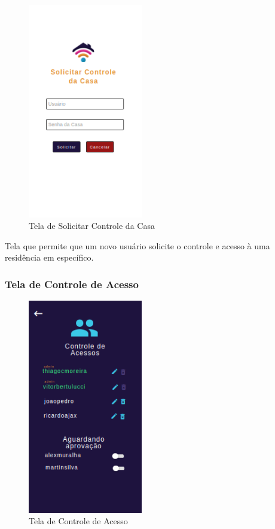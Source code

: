 \begin{figure}[!h]
\centering
\caption{Tela de Solicitar Controle da Casa}
\includegraphics[width=5cm]{figuras/solicitar_controle}
\end{figure}

\par Tela que permite que um novo usuário solicite o controle e acesso à uma residência em específico.

\subsubsection{Tela de Controle de Acesso}

\begin{figure}[!h]
\centering
\caption{Tela de Controle de Acesso}
\includegraphics[width=5cm]{figuras/controle_acesso_casa}
\end{figure}

